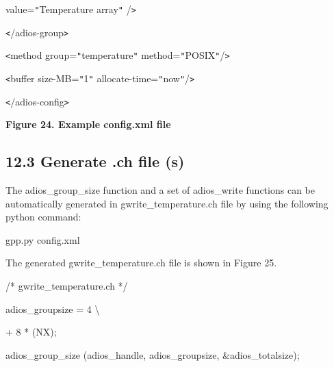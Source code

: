 \vspace{10pt}
\parindent=68pt
value=\texttt{"}Temperature array\texttt{"} /\texttt{>}

\vspace{10pt}
\parindent=0pt
\texttt{<}/adios-group\texttt{>}

\vspace{22pt}
\texttt{<}method group=\texttt{"}temperature\texttt{"} method=\texttt{"}POSIX\texttt{"}/\texttt{>}

\vspace{22pt}
\texttt{<}buffer size-MB=\texttt{"}1\texttt{"} allocate-time=\texttt{"}now\texttt{"}/\texttt{>}

\vspace{22pt}
\texttt{<}/adios-config\texttt{>}

\label{HRef119579330}\label{HToc144350183}

\vspace{22pt}
\leftskip=18pt
{\color{color20} \textbf{Figure 24. Example config.xml file\label{HToc84890293}\label{HToc212016669}\label{HToc212016911}\label{HToc182553442}}}

\vspace{10pt}
\subsection*{{\large 12.3 }{\large \textbf{Generate .ch file (s)}}}

\vspace{10pt}
\leftskip=0pt
The adios\_group\_size function and a set of adios\_write functions can be automatically 
generated in gwrite\_temperature.ch file by using the following python command: 

\vspace{22pt}
gpp.py config.xml

\vspace{22pt}
The generated gwrite\_temperature.ch file is shown in Figure 25.

\vspace{22pt}
/* gwrite\_temperature.ch */

\vspace{10pt}
adios\_groupsize = 4 \textbackslash{}

\vspace{10pt}
\parindent=57pt
+ 8 * (NX);

\vspace{10pt}
\parindent=0pt
adios\_group\_size (adios\_handle, adios\_groupsize, \&adios\_totalsize);

